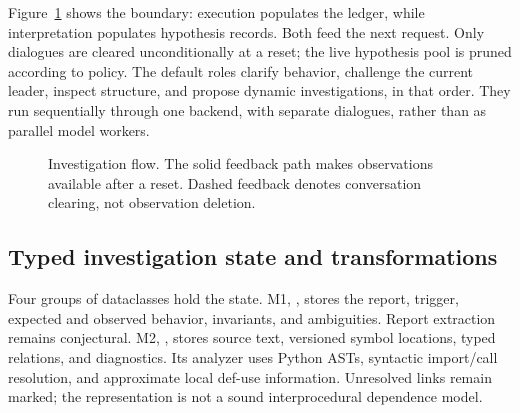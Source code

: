 \documentclass[letterpaper,journal]{IEEEtran}
\newcommand{\code}[1]{\texttt{\detokenize{#1}}}
\begin{document}
Figure~\ref{fig:flow} shows the boundary: execution populates the ledger, while interpretation populates hypothesis records. Both feed the next request. Only dialogues are cleared unconditionally at a reset; the live hypothesis pool is pruned according to policy. The default roles clarify behavior, challenge the current leader, inspect structure, and propose dynamic investigations, in that order. They run sequentially through one backend, with separate dialogues, rather than as parallel model workers.

\begin{figure}[t]
\centering
{}
\caption{Investigation flow. The solid feedback path makes observations available after a reset. Dashed feedback denotes conversation clearing, not observation deletion.}\label{fig:flow}
\end{figure}

\subsection{Typed investigation state and transformations}\label{sec:state}
Four groups of dataclasses hold the state. M1, \code{BehavioralModel}, stores the report, trigger, expected and observed behavior, invariants, and ambiguities. Report extraction remains conjectural. M2, \code{SystemModel}, stores source text, versioned symbol locations, typed relations, and diagnostics. Its analyzer uses Python ASTs, syntactic import/call resolution, and approximate local def-use information. Unresolved links remain marked; the representation is not a sound interprocedural dependence model.
\end{document}

